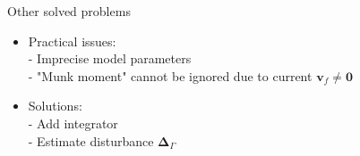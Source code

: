 \documentclass{beamer}
\begin{document}
\begin{frame}{Other solved problems}

	\begin{itemize}
		\item Practical issues: \\
		- Imprecise model parameters\\
		- "Munk moment" cannot be ignored due to current $\mathbf{v}_f \neq \mathbf{0}$
		\item Solutions:\\
		- Add integrator\\
		- Estimate disturbance $\mathbf{\Delta}_{\Gamma}$		
	\end{itemize}
 
\end{frame}
\end{document}
